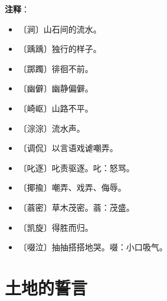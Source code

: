 \documentclass[12pt,UTF-8,openany]{ctexbook}
\begin{document}
\newpage

\textbf{注释}：

\vspace{-1em}

\begin{itemize}
    \setlength\itemsep{-0.2em}
    \item 〔涧〕山石间的流水。
    \item 〔踽踽〕独行的样子。
    \item 〔踯躅〕徘徊不前。
    \item 〔幽僻〕幽静偏僻。
    \item 〔崎岖〕山路不平。
    \item 〔淙淙〕流水声。
    \item 〔调侃〕以言语戏谑嘲弄。
    \item 〔叱逐〕叱责驱逐。叱：怒骂。
    \item 〔揶揄〕嘲弄、戏弄、侮辱。
    \item 〔蓊密〕草木茂密。蓊：茂盛。
    \item 〔凯旋〕得胜而归。
    \item 〔啜泣〕抽抽搭搭地哭。啜：小口吸气。
\end{itemize}

\chapter{土地的誓言}
\end{document}

